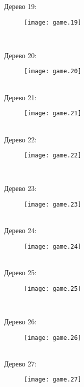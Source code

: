 \documentclass[pdftex,12pt,a4paper]{article}
\begin{document}
\newpage

Дерево 19: \\
\begin{figure}[htbp]
    \texttt{[image: game.19]}
\end{figure}\\

\newpage

Дерево 20: \\
\begin{figure}[htbp]
    \texttt{[image: game.20]}
\end{figure}\\


Дерево 21: \\
\begin{figure}[htbp]
    \texttt{[image: game.21]}
\end{figure}\\

Дерево 22: \\
\begin{figure}[htbp]
    \texttt{[image: game.22]}
\end{figure}\\

\newpage


Дерево 23: \\
\begin{figure}[htbp]
    \texttt{[image: game.23]}
\end{figure}\\

Дерево 24: \\
\begin{figure}[htbp]
    \texttt{[image: game.24]}
\end{figure}\\

Дерево 25: \\
\begin{figure}[htbp]
    \texttt{[image: game.25]}
\end{figure}\\

\newpage


Дерево 26: \\
\begin{figure}[htbp]
    \texttt{[image: game.26]}
\end{figure}\\


Дерево 27: \\
\begin{figure}[htbp]
    \texttt{[image: game.27]}
\end{figure}\\
\end{document}
